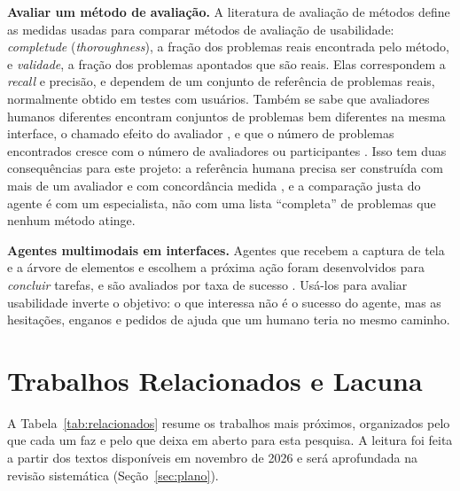\documentclass[12pt]{article}
\begin{document}
\textbf{Avaliar um método de avaliação.} A literatura de avaliação de métodos define \cite{hartson2003criteria} as medidas usadas para comparar métodos de avaliação de usabilidade: \textit{completude} (\textit{thoroughness}), a fração dos problemas reais encontrada pelo método, e \textit{validade}, a fração dos problemas apontados que são reais. Elas correspondem a \textit{recall} e precisão, e dependem de um conjunto de referência de problemas reais, normalmente obtido em testes com usuários. Também se sabe que avaliadores humanos diferentes encontram conjuntos de problemas bem diferentes na mesma interface, o chamado efeito do avaliador \cite{hertzum2001evaluator}, e que o número de problemas encontrados cresce com o número de avaliadores ou participantes \cite{nielsen1993model}. Isso tem duas consequências para este projeto: a referência humana precisa ser construída com mais de um avaliador e com concordância medida \cite{cohen1960kappa}, e a comparação justa do agente é com um especialista, não com uma lista ``completa'' de problemas que nenhum método atinge.

\textbf{Agentes multimodais em interfaces.} Agentes que recebem a captura de tela e a árvore de elementos e escolhem a próxima ação foram desenvolvidos para \textit{concluir} tarefas, e são avaliados por taxa de sucesso \cite{deng2023mind2web,zhou2024webarena}. Usá-los para avaliar usabilidade inverte o objetivo: o que interessa não é o sucesso do agente, mas as hesitações, enganos e pedidos de ajuda que um humano teria no mesmo caminho.

\section{Trabalhos Relacionados e Lacuna}
\label{sec:relacionados}

A Tabela~\ref{tab:relacionados} resume os trabalhos mais próximos, organizados pelo que cada um faz e pelo que deixa em aberto para esta pesquisa. A leitura foi feita a partir dos textos disponíveis em novembro de 2026 e será aprofundada na revisão sistemática (Seção~\ref{sec:plano}).
\end{document}
